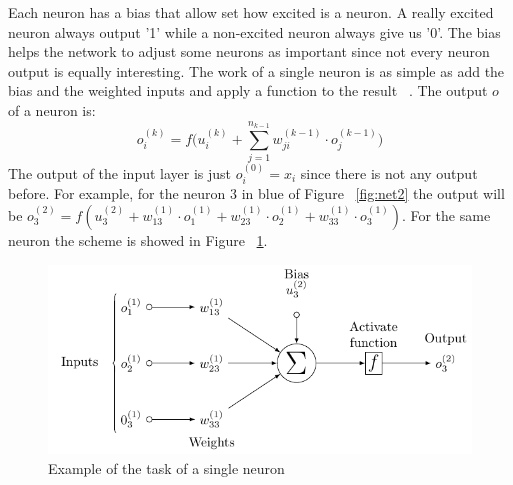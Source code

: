 Each neuron has a bias that allow set how excited is a neuron. A really excited neuron always output '1' while a non-excited neuron always give us '0'. The bias helps the network to adjust some neurons as important since not every neuron output is equally interesting. The work of a single neuron is as simple as add the bias and the weighted inputs and apply a function to the result ~\cite[Chapter~27]{springer}. The output $o$ of a neuron is:
\begin{equation}
  o^{(k)}_i=f\bigg(u^{(k)}_i+\sum^{n_{k-1}}_{j=1}w^{(k-1)}_{ji}\cdot o^{(k-1)}_j\bigg)
\end{equation}
The output of the input layer is just $o^{(0)}_i=x_i$ since there is not any output before. For example, for the neuron 3 in blue of Figure ~\ref{fig:net2} the output will be $o^{(2)}_3=f(u^{(2)}_3+w^{(1)}_{13}\cdot o^{(1)}_1+w^{(1)}_{23}\cdot o^{(1)}_2+w^{(1)}_{33}\cdot o^{(1)}_3)$. For the same neuron the scheme is showed in Figure ~\ref{fig:neur1}.
\begin{figure}
  \center
  \includegraphics[scale=1]{images/neuron1.pdf}
  \caption{\label{fig:neur1}Example of the task of a single neuron \cite{neurdiag}}
\end{figure}
